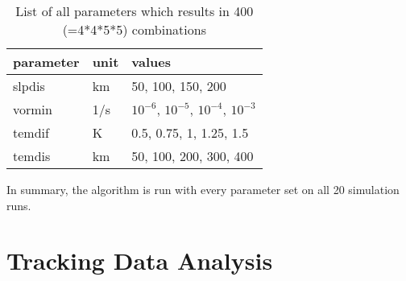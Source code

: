 \begin{table}[ht]
	\centering
	\begin{tabular}{|l|l|l|}
		\hline
		\textbf{parameter} & \textbf{unit} & \textbf{values}        \\ \hline
		slpdis             & km             & 50, 100, 150, 200   \\
		vormin             & 1/s           & $10^{-6}$, $10^{-5}$, $10^{-4}$, $10^{-3}$       \\
		temdif             & K             & 0.5, 0.75, 1, 1.25, 1.5       \\
		temdis             & km             & 50, 100, 200, 300, 400 \\ \hline
	\end{tabular}
	\caption{List of all parameters which results in 400 (=4*4*5*5) combinations }
	\label{tab:param_combos}
\end{table}
In summary, the algorithm is run with every parameter set on all 20
simulation runs.

\section{Tracking Data Analysis}
